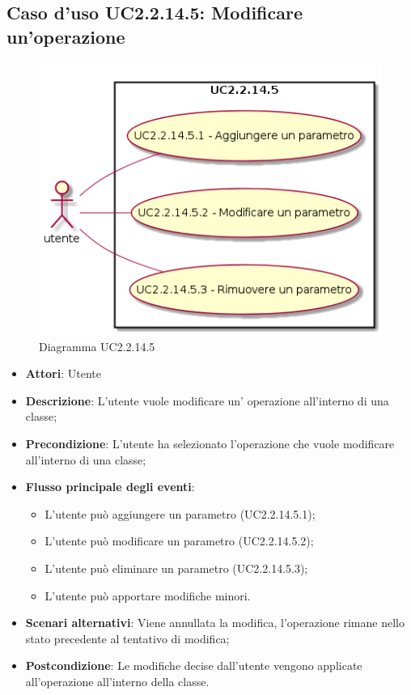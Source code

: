 \documentclass[../AnalisiDeiRequisiti.tex]{subfiles}
\begin{document}
			\subsection{Caso d'uso UC2.2.14.5: Modificare un'operazione}
			\begin{figure} [H]
				\centering
				\includegraphics[scale=0.45]{./Figures/UC2-2-14-5.png}
				\caption{Diagramma UC2.2.14.5}\label{}
			\end{figure}
			\begin{itemize}
				\item \textbf{Attori}: Utente
				\item \textbf{Descrizione}: L'utente vuole modificare un' operazione all'interno di una classe;
				\item \textbf{Precondizione}: L'utente ha selezionato l'operazione che vuole modificare all'interno di una classe;
				\item \textbf{Flusso principale degli eventi}: \begin{itemize}
					\item L'utente può aggiungere un parametro (UC2.2.14.5.1);
					\item L'utente può modificare un parametro (UC2.2.14.5.2);
					\item L'utente può eliminare un parametro (UC2.2.14.5.3);
					\item L'utente può apportare modifiche minori.
				\end{itemize}
				\item \textbf{Scenari alternativi}: Viene annullata la modifica, l'operazione rimane nello stato precedente al tentativo di modifica;
				\item \textbf{Postcondizione}: Le modifiche decise dall'utente vengono applicate all'operazione all'interno della classe.
			\end{itemize}
\end{document}
